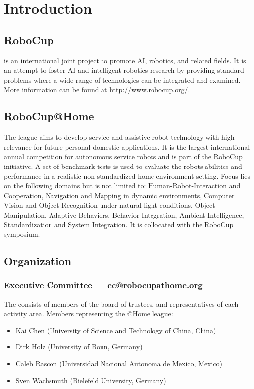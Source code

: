\chapter{Introduction}
\label{chap:introduction}


\section{RoboCup}
 is an international joint project to promote AI, robotics, and related fields. It is an attempt to foster AI and intelligent robotics research by providing standard problems where a wide range of technologies can be integrated and examined. More information can be found at http://www.robocup.org/.

\section{RoboCup@Home}
The  league aims to develop service and assistive robot technology with high relevance for future personal domestic applications. It is the largest international annual competition for autonomous service robots and is part of the RoboCup initiative. A set of benchmark tests is used to evaluate the robots abilities and performance in a realistic non-standardized home environment setting. Focus lies on the following domains but is not limited to: Human-Robot-Interaction and Cooperation, Navigation and Mapping in dynamic environments, Computer Vision and Object Recognition under natural light conditions, Object Manipulation, Adaptive Behaviors, Behavior Integration, Ambient Intelligence, Standardization and System Integration. It is collocated with the RoboCup symposium.

\section{Organization}

\subsection{Executive Committee --- ec@robocupathome.org}
\label{sec:ec}
The  consists of members of the board of trustees, and representatives of each activity area. Members representing the @Home league:
\begin{itemize}
  \item Kai Chen (University of Science and Technology of China, China)
  \item Dirk Holz (University of Bonn, Germany)
  \item Caleb Rascon (Universidad Nacional Autonoma de Mexico, Mexico)
  \item Sven Wachsmuth (Bielefeld University, Germany)
\end{itemize}

